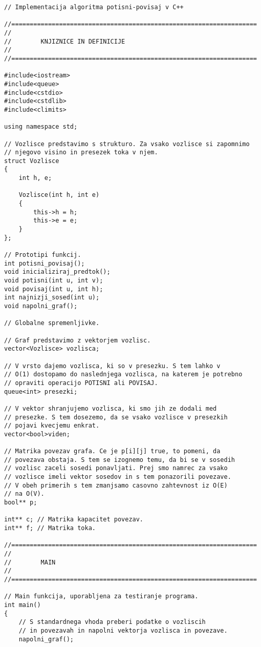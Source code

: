 \documentclass[mat1]{fmfdelo}
\begin{document}
\begin{verbatim}
// Implementacija algoritma potisni-povisaj v C++

//===================================================================
//
//        KNJIZNICE IN DEFINICIJE
//
//===================================================================

#include<iostream>
#include<queue>
#include<cstdio>
#include<cstdlib>
#include<climits>

using namespace std;

// Vozlisce predstavimo s strukturo. Za vsako vozlisce si zapomnimo
// njegovo visino in presezek toka v njem.
struct Vozlisce
{
    int h, e;
    
    Vozlisce(int h, int e)
    {
        this->h = h;
        this->e = e;
    }
};

// Prototipi funkcij.
int potisni_povisaj();
void inicializiraj_predtok();
void potisni(int u, int v);
void povisaj(int u, int h);
int najnizji_sosed(int u);
void napolni_graf();

// Globalne spremenljivke.

// Graf predstavimo z vektorjem vozlisc.
vector<Vozlisce> vozlisca;

// V vrsto dajemo vozlisca, ki so v presezku. S tem lahko v
// O(1) dostopamo do naslednjega vozlisca, na katerem je potrebno
// opraviti operacijo POTISNI ali POVISAJ.
queue<int> presezki;

// V vektor shranjujemo vozlisca, ki smo jih ze dodali med
// presezke. S tem dosezemo, da se vsako vozlisce v presezkih
// pojavi kvecjemu enkrat.
vector<bool>viden;

// Matrika povezav grafa. Ce je p[i][j] true, to pomeni, da
// povezava obstaja. S tem se izognemo temu, da bi se v sosedih
// vozlisc zaceli sosedi ponavljati. Prej smo namrec za vsako
// vozlisce imeli vektor sosedov in s tem ponazorili povezave.
// V obeh primerih s tem zmanjsamo casovno zahtevnost iz O(E)
// na O(V).
bool** p;

int** c; // Matrika kapacitet povezav.
int** f; // Matrika toka.

//===================================================================
//
//        MAIN
//
//===================================================================

// Main funkcija, uporabljena za testiranje programa.
int main()
{
    // S standardnega vhoda preberi podatke o vozliscih
    // in povezavah in napolni vektorja vozlisca in povezave.
    napolni_graf();
        

\end{verbatim}
\end{document}
